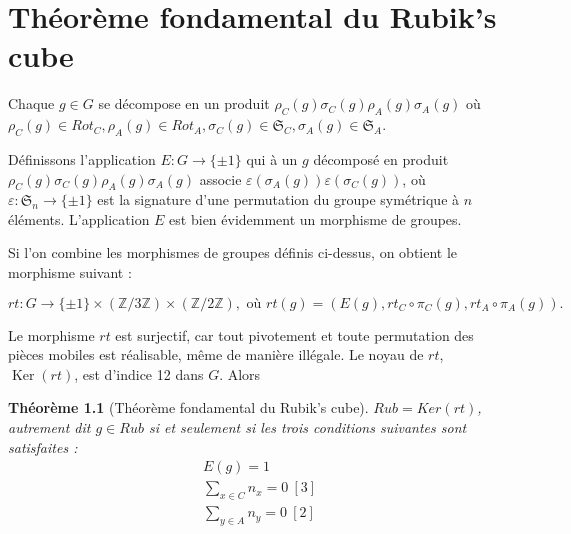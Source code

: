 \documentclass[french]{report}
\newtheorem{theorem}{Théorème}
\begin{document}



\chapter{Théorème fondamental du Rubik's cube} \label{chap_fondamental}

Chaque $g \in G$ se décompose en un produit $\rho _{C}(g) \sigma _{C}(g)  \rho _{A}(g) \sigma _{A}(g)$ où $\rho _{ C}(g) \in Rot_C, \rho_A(g) \in Rot_A, \sigma_C(g) \in \mathfrak{S}_{C}, \sigma _{A}(g) \in \mathfrak{S}_{A}$.

Définissons l'application $E : G \to \{ \pm 1 \} $ qui à un $g$ décomposé en produit $\rho_C(g) \sigma_C(g) \rho_A(g) \sigma_A(g)$ associe $\varepsilon (\sigma_A(g)) \varepsilon (\sigma_C(g))$, où $\varepsilon : \mathfrak{S}_n \to \{ \pm 1 \} $ est la signature d'une permutation du groupe symétrique à $n$ éléments. L'application $E$ est bien évidemment un morphisme de groupes.

Si l'on combine les morphismes de groupes définis ci-dessus, on obtient le morphisme suivant :

$$rt : G \to \{ \pm 1 \} \times (\mathbb{Z}/{ 3 }\mathbb{Z}) \times (\mathbb{Z}/{ 2 }\mathbb{Z}), \text{ où } rt(g) = (E(g), rt_C \circ \pi_C(g), rt_A \circ \pi_A(g)). $$

Le morphisme $rt$ est surjectif, car tout pivotement et toute permutation des pièces mobiles est réalisable, même de manière illégale. Le noyau de $rt$, $\operatorname{Ker}(rt)$, est d'indice 12 dans $G$. Alors

\begin{theorem}[Théorème fondamental du Rubik's cube]\label{thm-fondamental}
  $Rub = Ker(rt)$, autrement dit $g \in Rub$ si et seulement si les trois conditions suivantes sont satisfaites :
  \begin{gather}
    E (g)=1 \label{permutation-paire}\\
    \sum_{x \in C} n_x = 0 \ [3] \label{orientation-totale-coins} \\
    \sum_{y \in A} n_y = 0 \ [2] \label{orientation-totale-aretes}
  \end{gather}
\end{theorem}
\end{document}
